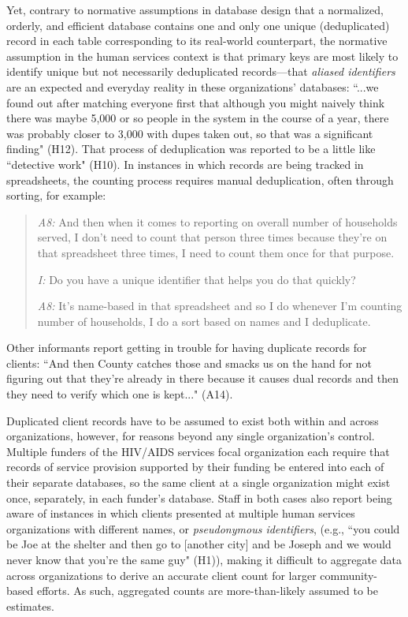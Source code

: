 Yet, contrary to normative assumptions in database design that a normalized, orderly, and efficient database contains one and only one unique (deduplicated) record in each table corresponding to its real-world counterpart, the normative assumption in the human services context is that primary keys are most likely to identify unique but not necessarily deduplicated records---that \textit{aliased identifiers} are an expected and everyday reality in these organizations' databases: ``...we found out after matching everyone first that although you might naively think there was maybe 5,000 or so people in the system in the course of a year, there was probably closer to 3,000 with dupes taken out, so that was a significant finding" (H12). That process of deduplication was reported to be a little like ``detective work" (H10). In instances in which records are being tracked in spreadsheets, the counting process requires manual deduplication, often through sorting, for example: 

\begin{quote}\singlespacing
\textit{A8:} And then when it comes to reporting on overall number of households served, I don't need to count that person three times because they're on that spreadsheet three times, I need to count them once for that purpose.

\textit{I:} Do you have a unique identifier that helps you do that quickly? 

\textit{A8:} It's name-based in that spreadsheet and so I do whenever I'm counting number of households, I do a sort based on names and I deduplicate.
\end{quote}

Other informants report getting in trouble for having duplicate records for clients: ``And then County catches those and smacks us on the hand for not figuring out that they're already in there because it causes dual records and then they need to verify which one is kept..." (A14). 

Duplicated client records have to be assumed to exist both within and across organizations, however, for reasons beyond any single organization's control. Multiple funders of the HIV/AIDS services focal organization each require that records of service provision supported by their funding be entered into each of their separate databases, so the same client at a single organization might exist once, separately, in each funder's database. Staff in both cases also report being aware of instances in which clients presented at multiple human services organizations with different names, or \textit{pseudonymous identifiers}, (e.g., ``you could be Joe at the shelter and then go to [another city] and be Joseph and we would never know that you're the same guy" (H1)), making it difficult to aggregate data across organizations to derive an accurate client count for larger community-based efforts. As such, aggregated counts are more-than-likely assumed to be estimates. 

